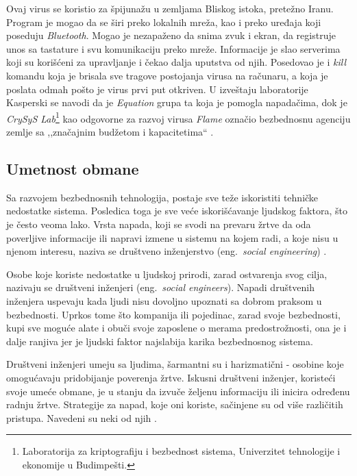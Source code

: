\documentclass[a4paper]{article}
\begin{document}
Ovaj virus se koristio za špijunažu u zemljama Bliskog istoka, pretežno Iranu. Program je mogao da se širi preko lokalnih mreža, kao i preko uređaja koji poseduju {\em Bluetooth}. Mogao je nezapaženo da snima zvuk i ekran, da registruje unos sa tastature i svu komunikaciju preko mreže. Informacije je slao serverima koji su korišćeni za upravljanje i čekao dalja uputstva od njih. Posedovao je i \textit{kill} komandu koja je brisala sve tragove postojanja virusa na računaru, a koja je poslata odmah pošto je virus prvi put otkriven. U izveštaju laboratorije Kasperski se navodi da je \textit{Equation} grupa ta koja je pomogla napadačima, dok je \textit{CrySyS Lab}\footnote{ Laboratorija za kriptografiju i bezbednost sistema, Univerzitet tehnologije i ekonomije u Budimpešti.} kao odgovorne za razvoj virusa \textit{Flame} označio bezbednosnu agenciju zemlje sa ,,značajnim budžetom i kapacitetima`` \cite{flame}.

\subsection{Umetnost obmane}
\label{deception}

Sa razvojem bezbednosnih tehnologija, postaje sve teže
iskoristiti tehničke nedostatke sistema.
Posledica toga je sve veće iskorišćavanje ljudskog
faktora, što je često veoma lako. Vrsta napada, koji se
svodi na prevaru žrtve da oda poverljive informacije ili
napravi izmene u sistemu na kojem radi, a koje nisu u
njenom interesu, naziva se društveno inženjerstvo
(eng.~{\em social engineering}) \cite{deception}.

Osobe koje koriste nedostatke u ljudskoj prirodi, zarad ostvarenja svog cilja, nazivaju se društveni inženjeri (eng.~{\em social engineers}). Napadi društvenih inženjera uspevaju kada ljudi nisu dovoljno upoznati sa dobrom praksom u bezbednosti. Uprkos tome što kompanija ili pojedinac, zarad svoje bezbednosti, kupi sve moguće alate i obuči svoje zaposlene o merama predostrožnosti, ona je i dalje ranjiva jer je ljudski faktor najslabija karika bezbednosnog sistema.

Društveni inženjeri umeju sa ljudima, šarmantni su i harizmatični - osobine koje omogućavaju pridobijanje poverenja žrtve. Iskusni društveni inženjer, koristeći svoje umeće obmane, je u stanju da izvuče željenu informaciju ili inicira određenu radnju žrtve. Strategije za napad, koje oni koriste, sačinjene su od više različitih pristupa. Navedeni su neki od njih \cite{deception}.
\end{document}
